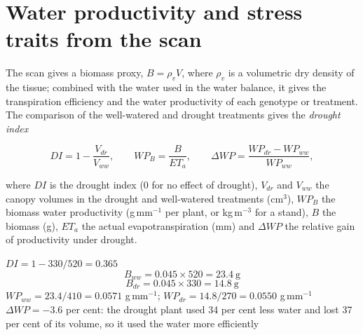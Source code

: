 \section{Water productivity and stress traits from the scan}
The scan gives a biomass proxy, $B=\rho_vV$, where $\rho_v$ is a volumetric dry density of the tissue; combined with the water used in the water balance, it gives the transpiration efficiency and the water productivity of each genotype or treatment. The comparison of the well-watered and drought treatments gives the \emph{drought index}

\begin{equation}\boxed{DI=1-\frac{V_{dr}}{V_{ww}},\qquad WP_{B}=\frac{B}{ET_a},\qquad \Delta WP=\frac{WP_{dr}-WP_{ww}}{WP_{ww}},}\label{eq:ph-di}\end{equation}
\par\noindent where $DI$ is the drought index (0 for no effect of drought), $V_{dr}$ and $V_{ww}$ the canopy volumes in the drought and well-watered treatments (cm$^3$), $WP_B$ the biomass water productivity (g\,mm$^{-1}$ per plant, or kg\,m$^{-3}$ for a stand), $B$ the biomass (g), $ET_a$ the actual evapotranspiration (mm) and $\Delta WP$ the relative gain of productivity under drought.



\sol {}\ans $DI=1-330/520=0.365$ \ans \[B_{ww}=0.045\times520=23.4\ \text{g}\]
\[B_{dr}=0.045\times330=14.8\ \text{g}\] \ans $WP_{ww}=23.4/410=0.0571$ g\,mm$^{-1}$; $WP_{dr}=14.8/270=0.0550$ g\,mm$^{-1}$ \ans $\Delta WP=-3.6$ per cent: the drought plant used 34 per cent less water and lost 37 per cent of its volume, so it used the water more efficiently \finans


